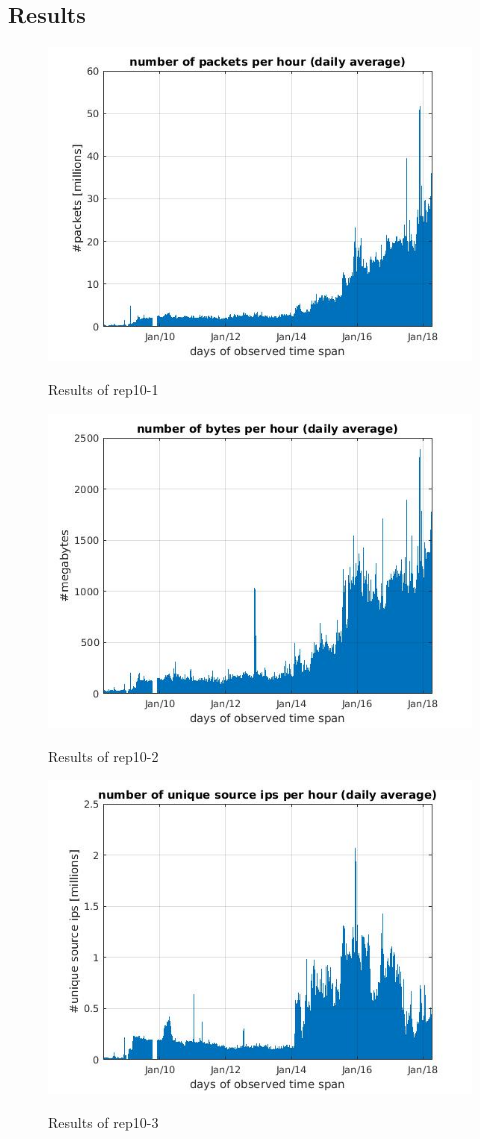 \subsection*{Results}
\begin{figure}[H]
\center
\includegraphics[width=.7\textwidth]{./chapters/plots/rep10_1.jpg}\\
\caption{Results of rep10-1}
\end{figure}
\begin{figure}[H]
\center
\includegraphics[width=.7\textwidth]{./chapters/plots/rep10_2.jpg}\\
\caption{Results of rep10-2}
\end{figure}
\begin{figure}[H]
\center
\includegraphics[width=.7\textwidth]{./chapters/plots/rep10_3.jpg}\\
\caption{Results of rep10-3}
\end{figure}
